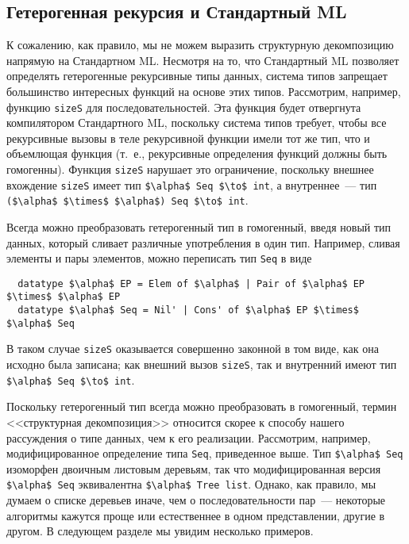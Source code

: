 \subsection{Гетерогенная рекурсия и Стандартный ML}
\label{sc:10.1.1}

К сожалению, как правило, мы не можем выразить структурную
декомпозицию напрямую на Стандартном ML. Несмотря на то, что
Стандартный ML позволяет определять гетерогенные рекурсивные типы
данных, система типов запрещает большинство интересных функций на
основе этих типов. Рассмотрим, например, функцию \lstinline!sizeS! для
последовательностей. Эта функция будет отвергнута компилятором
Стандартного ML, поскольку система типов требует, чтобы все
рекурсивные вызовы в теле рекурсивной функции имели тот же тип, что и
объемлющая функция (т.~е., рекурсивные определения функций должны быть
гомогенны). Функция \lstinline!sizeS! нарушает это ограничение,
поскольку внешнее вхождение \lstinline!sizeS! имеет тип
\lstinline!$\alpha$ Seq $\to$ int!, а внутреннее~--- тип
\lstinline!($\alpha$ $\times$ $\alpha$) Seq $\to$ int!.

Всегда можно преобразовать гетерогенный тип в гомогенный, введя новый
тип данных, который сливает различные употребления в один
тип. Например, сливая элементы и пары элементов, можно переписать тип
\lstinline!Seq! в виде
\begin{lstlisting}
  datatype $\alpha$ EP = Elem of $\alpha$ | Pair of $\alpha$ EP $\times$ $\alpha$ EP
  datatype $\alpha$ Seq = Nil' | Cons' of $\alpha$ EP $\times$ $\alpha$ Seq
\end{lstlisting}
В таком случае \lstinline!sizeS! оказывается совершенно законной в том
виде, как она исходно была записана; как внешний вызов
\lstinline!sizeS!, так и внутренний имеют тип
\lstinline!$\alpha$ Seq $\to$ int!.

Поскольку гетерогенный тип всегда можно преобразовать в гомогенный,
термин <<структурная декомпозиция>> относится скорее к способу нашего
рассуждения о типе данных, чем к его реализации. Рассмотрим, например,
модифицированное определение типа \lstinline!Seq!, приведенное
выше. Тип \lstinline!$\alpha$ Seq! изоморфен двоичным листовым
деревьям, так что модифицированная версия \lstinline!$\alpha$ Seq!
эквивалентна \lstinline!$\alpha$ Tree list!. Однако, как правило, мы
думаем о списке деревьев иначе, чем о последовательности пар~---
некоторые алгоритмы кажутся проще или естественнее в одном
представлении, другие в другом. В следующем разделе мы увидим
несколько примеров.


